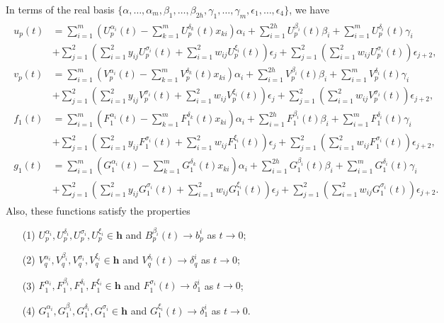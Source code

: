 In terms of the real basis
\(\{\alpha,\ldots,\alpha_{m},\beta_{1},\ldots,\beta_{2h},
\gamma_{1},\ldots,\gamma_{m},\epsilon_{1},\ldots,\epsilon_{4}\}\), 
we have
\begin{align*}
\begin{split}
u_{p}(t) &= \sum_{i=1}^{m} \left(U^{\alpha_{i}}_{p}(t)-
\sum_{k=1}^{m}U_{p}^{\delta_{k}}(t)x_{ki}\right) \alpha_{i}+
\sum_{i=1}^{2h} U^{\beta_{i}}_{p}(t) \beta_{i} + 
\sum_{i=1}^{m} U^{\delta_{i}}_{p}(t) \gamma_{i}\\
&+\sum_{j=1}^{2}\left(\sum_{i=1}^{2}y_{ij}U_{p}^{\sigma_{i}}(t)+
\sum_{i=1}^{2}w_{ij}U_{p}^{\xi_{i}}(t)\right)\epsilon_{j}
+\sum_{j=1}^{2}\left(\sum_{i=1}^{2}w_{ij}U_{p}^{\sigma_{i}}(t)\right)\epsilon_{j+2},\\
v_{p}(t) &= \sum_{i=1}^{m} \left(V^{\alpha_{i}}_{p}(t)-
\sum_{k=1}^{m}V_{p}^{\delta_{k}}(t)x_{ki}\right) \alpha_{i}+
\sum_{i=1}^{2h} V^{\beta_{i}}_{p}(t) \beta_{i} + 
\sum_{i=1}^{m} V^{\delta_{i}}_{p}(t) \gamma_{i}\\
&+\sum_{j=1}^{2}\left(\sum_{i=1}^{2}y_{ij}V_{p}^{\sigma_{i}}(t)+
\sum_{i=1}^{2}w_{ij}V_{p}^{\xi_{i}}(t)\right)\epsilon_{j}
+\sum_{j=1}^{2}\left(\sum_{i=1}^{2}w_{ij}V_{p}^{\sigma_{i}}(t)\right)\epsilon_{j+2},\\
f_{1}(t) &= \sum_{i=1}^{m} \left(F^{\alpha_{i}}_{1}(t)-
\sum_{k=1}^{m}F_{1}^{\delta_{k}}(t)x_{ki}\right) \alpha_{i}+
\sum_{i=1}^{2h} F^{\beta_{i}}_{1}(t) \beta_{i} + 
\sum_{i=1}^{m} F^{\delta_{i}}_{1}(t) \gamma_{i}\\
&+\sum_{j=1}^{2}\left(\sum_{i=1}^{2}y_{ij}F_{1}^{\sigma_{i}}(t)+
\sum_{i=1}^{2}w_{ij}F_{1}^{\xi_{i}}(t)\right)\epsilon_{j}
+\sum_{j=1}^{2}\left(\sum_{i=1}^{2}w_{ij}F_{1}^{\sigma_{i}}(t)\right)\epsilon_{j+2},\\
g_{1}(t) &= \sum_{i=1}^{m} \left(G^{\alpha_{i}}_{1}(t)-
\sum_{k=1}^{m}G_{1}^{\delta_{k}}(t)x_{ki}\right) \alpha_{i}+
\sum_{i=1}^{2h} G^{\beta_{i}}_{1}(t) \beta_{i} + 
\sum_{i=1}^{m} G^{\delta_{i}}_{1}(t) \gamma_{i}\\
&+\sum_{j=1}^{2}\left(\sum_{i=1}^{2}y_{ij}G_{1}^{\sigma_{i}}(t)+
\sum_{i=1}^{2}w_{ij}G_{1}^{\xi_{i}}(t)\right)\epsilon_{j}
+\sum_{j=1}^{2}\left(\sum_{i=1}^{2}w_{ij}G_{1}^{\sigma_{i}}(t)\right)\epsilon_{j+2}.
\end{split}
\end{align*}
Also, these functions satisfy the properties
\begin{itemize}
\item[(1)] \(U_{p}^{\alpha_{i}}, U_{p}^{\delta_{i}}, 
U_{p}^{\sigma_{i}}, U_{p}^{\xi_{i}}\in\mathbf{h}\)
and \(B_{p}^{\beta_{i}}(t)\to b_{p}^{i}\) as \(t\to 0\);
\item[(2)] \(V_{q}^{\alpha_{i}}, V_{q}^{\beta_{i}}, 
V_{q}^{\sigma_{i}}, V_{q}^{\xi_{i}}\in\mathbf{h}\)
and \(V_{q}^{\delta_{i}}(t)\to \delta_{q}^{i}\) as \(t\to 0\);
\item[(3)] \(F_{1}^{\alpha_{i}}, F_{1}^{\beta_{i}}, F_{1}^{\delta_{i}}, 
F_{1}^{\xi_{i}}\in\mathbf{h}\)
and \(F_{1}^{\sigma_{i}}(t)\to \delta_{1}^{i}\) as \(t\to 0\);
\item[(4)] \(G_{1}^{\alpha_{i}}, G_{1}^{\beta_{i}}, G_{1}^{\delta_{i}}, 
G_{1}^{\sigma_{i}}\in\mathbf{h}\)
and \(G_{1}^{\xi_{i}}(t)\to \delta_{1}^{i}\) as \(t\to 0\).
\end{itemize}

